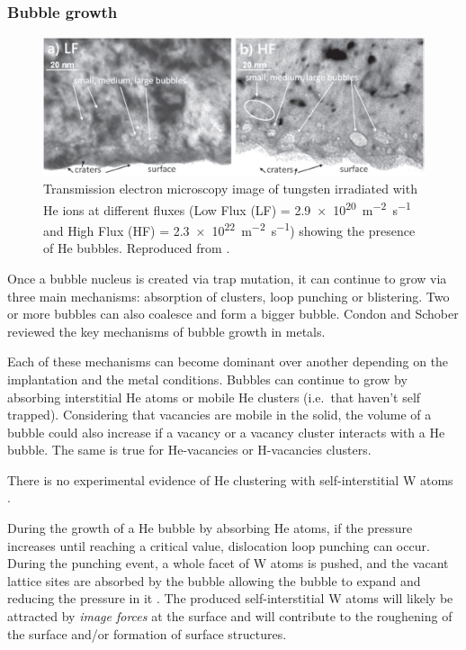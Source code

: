 \subsubsection{Bubble growth}

\begin{figure} [h!]
    \centering
    \includegraphics[width=\linewidth]{Figures/Chapter1/helium_bubbles_ialovega.jpg}
    \caption{Transmission electron microscopy image of tungsten irradiated with He ions at different fluxes (Low Flux (LF) = \SI{2.9e20}{m^{-2}.s^{-1}} and High Flux (HF) = \SI{2.3e22}{m^{-2}.s^{-1}}) showing the presence of He bubbles. Reproduced from \cite{ialovega_hydrogen_2020}.}
\end{figure}

Once a bubble nucleus is created via \gls{trap mutation}, it can continue to grow via three main mechanisms: absorption of clusters, \gls{loop punching} or blistering.
Two or more bubbles can also coalesce and form a bigger bubble.
Condon and Schober  reviewed the key mechanisms of bubble growth in metals.

Each of these mechanisms can become dominant over another depending on the implantation and the metal conditions. 
Bubbles can continue to grow by absorbing interstitial He atoms or mobile He clusters (i.e.\ that haven't self trapped).
Considering that vacancies are mobile in the solid, the volume of a bubble could also increase if a \gls{vacancy} or a \gls{vacancy} cluster interacts with a He bubble.
The same is true for He-vacancies or H-vacancies clusters.

There is no experimental evidence of He clustering with \gls{self-interstitial} \gls{W} atoms .

During the growth of a He bubble by absorbing He atoms, if the pressure increases until reaching a critical value, \gls{dislocation loop} punching can occur.
During the punching event, a whole facet of \gls{W} atoms is pushed, and the vacant \gls{lattice} sites are absorbed by the bubble allowing the bubble to expand and reducing the pressure in it .
The produced \gls{self-interstitial} \gls{W} atoms will likely be attracted by \textit{image forces} at the surface and will contribute to the roughening of the surface and/or formation of surface structures.

